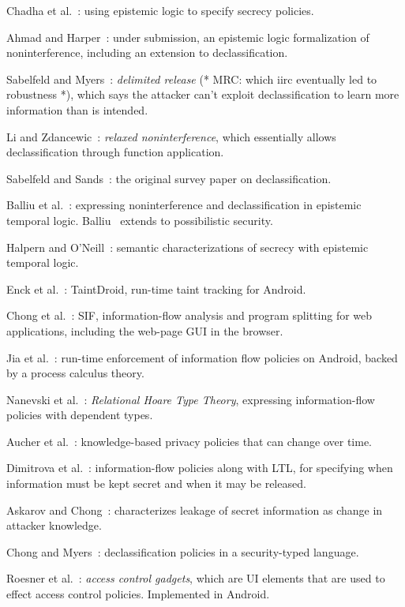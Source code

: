 \documentclass[conference]{IEEEtran}
\theoremstyle{definition}
\begin{document}
Chadha et al.~\cite{Lee:09}: using epistemic logic to specify secrecy policies.

Ahmad and Harper~\cite{Ahmad:13}: under submission, an epistemic logic formalization of 
noninterference, including an extension to declassification.

Sabelfeld and Myers~\cite{Sabelfeld:04}: \emph{delimited release} (* MRC: which iirc eventually led to robustness *), which says the attacker can't exploit declassification to learn more information than is intended.

Li and Zdancewic~\cite{Li:05}: \emph{relaxed noninterference}, which essentially allows declassification through function application.

Sabelfeld and Sands~\cite{Sabelfeld:05}: the original survey paper on declassification.  

Balliu et al.~\cite{Balliu:11}: expressing noninterference and declassification in epistemic temporal logic.  Balliu~\cite{Balliu:13} extends to possibilistic security.

Halpern and O'Neill~\cite{Halpern:08}: semantic characterizations of secrecy with epistemic temporal logic.

Enck et al.~\cite{Enck:10}: TaintDroid, run-time taint tracking for Android.

Chong et al.~\cite{Chong:07}: SIF, information-flow analysis and program splitting for web applications, including the web-page GUI in the browser.

Jia et al.~\cite{Jia:13}: run-time enforcement of information flow policies on Android, backed by a process calculus theory.

Nanevski et al.~\cite{Nanevski:13}: \emph{Relational Hoare Type Theory}, expressing information-flow policies with dependent types.

Aucher et al.~\cite{Aucher:11}:  knowledge-based privacy policies that can change over time.

Dimitrova et al.~\cite{Dimitrova:12}: information-flow policies along with LTL, for specifying when information must be kept secret and when it may be released.

Askarov and Chong~\cite{Askarov:12}: characterizes leakage of secret information as change in attacker knowledge.

Chong and Myers~\cite{Chong:04}: declassification policies in a security-typed language.

Roesner et al.~\cite{Roesner:12}: \emph{access control gadgets}, which are UI elements that are used to effect access control policies.  Implemented in Android.
\end{document}
